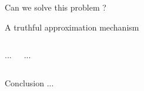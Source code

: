 \documentclass[aspectratio=169]{beamer}
\begin{document}
\begin{frame}[standout]
    Can we solve this problem ?
\end{frame}

\begin{frame}{A truthful approximation mechanism}
    \begin{columns}
        ...

        ...
    \end{columns}
\end{frame}

\begin{frame}{Conclusion}
    ...
\end{frame}
\end{document}
